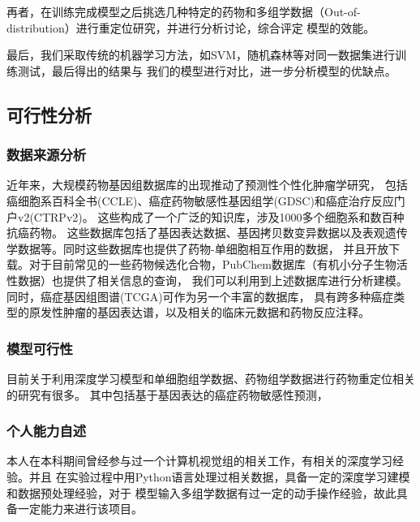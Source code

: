 再者，在训练完成模型之后挑选几种特定的药物和多组学数据（Out-of-distribution）进行重定位研究，并进行分析讨论，综合评定
模型的效能。

最后，我们采取传统的机器学习方法，如SVM，随机森林等对同一数据集进行训练测试，最后得出的结果与
我们的模型进行对比，进一步分析模型的优缺点。


\subsection{可行性分析}

\subsubsection{数据来源分析}
近年来，大规模药物基因组数据库的出现推动了预测性个性化肿瘤学研究，
包括癌细胞系百科全书(CCLE)、癌症药物敏感性基因组学(GDSC)和癌症治疗反应门户v2(CTRPv2)。
这些构成了一个广泛的知识库，涉及1000多个细胞系和数百种抗癌药物。
这些数据库包括了基因表达数据、基因拷贝数变异数据以及表观遗传学数据等。同时这些数据库也提供了药物-单细胞相互作用的数据，
并且开放下载。对于目前常见的一些药物候选化合物，PubChem数据库（有机小分子生物活性数据）也提供了相关信息的查询，
我们可以利用到上述数据库进行分析建模。同时，癌症基因组图谱(TCGA)可作为另一个丰富的数据库，
具有跨多种癌症类型的原发性肿瘤的基因表达谱，以及相关的临床元数据和药物反应注释。


\subsubsection{模型可行性}
目前关于利用深度学习模型和单细胞组学数据、药物组学数据进行药物重定位相关的研究有很多。
其中包括基于基因表达的癌症药物敏感性预测\cite{chawlaGeneExpressionBased2022}，\cite{vladgrozaDrugRepurposingUsing2021}




\subsubsection{个人能力自述}
本人在本科期间曾经参与过一个计算机视觉组的相关工作，有相关的深度学习经验。并且
在实验过程中用Python语言处理过相关数据，具备一定的深度学习建模和数据预处理经验，对于
模型输入多组学数据有过一定的动手操作经验，故此具备一定能力来进行该项目。
